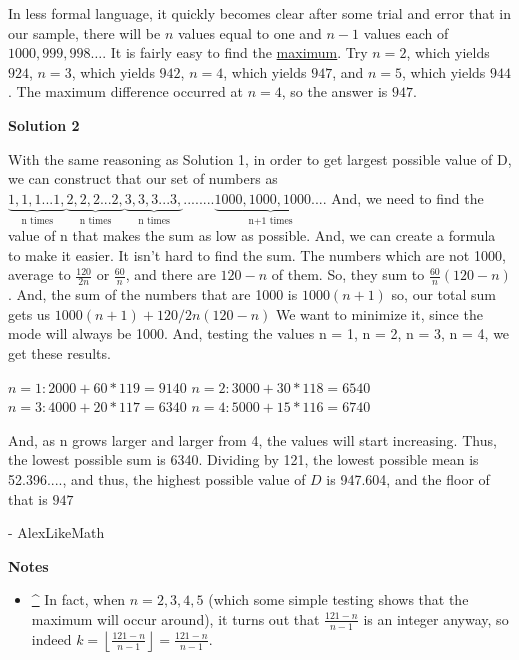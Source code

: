 \begin{enumerate}
 In less formal language, it quickly becomes clear after some trial and error that in our sample, there will be $n$ values equal to one and $n-1$ values each of $1000, 999, 998 \ldots$. It is fairly easy to find the \href{https://artofproblemsolving.com/wiki/index.php?title=Maximum}{maximum}. Try $n=2$, which yields $924$, $n=3$, which yields $942$,  $n=4$, which yields $947$, and $n=5$, which yields $944$. The maximum difference occurred at $n=4$, so the answer is $947$.

 



\textbf{Solution 2}

With the same reasoning as Solution 1, in order to get largest possible value of D, we can construct that our set of numbers as $\underbrace{1,1,1...1,}_\text{n times}\underbrace{2,2,2...2,}_\text{n times}\underbrace{3,3,3...3,}_\text{n times}........\underbrace{1000,1000,1000....}_\text{n+1  times}$ And, we need to find the value of n that makes the sum as low as possible. And, we can create a formula to make it easier. It isn't hard to find the sum. The numbers which are not 1000, average to $\frac{120}{2n}$ or $\frac{60}{n}$, and there are $120-n$ of them. So, they sum to $\frac{60}{n}(120-n)$. And, the sum of the numbers that are 1000 is $1000(n+1)$ so, our total sum gets us $1000(n+1)+120/2n(120-n)$ We want to minimize it, since the mode will always be 1000. And, testing the values n = 1, n = 2, n = 3, n = 4, we get these results.

 $n = 1: 2000+60*119 = 9140$
$n = 2: 3000+30*118 = 6540$
$n = 3: 4000+20*117 = 6340$
$n = 4: 5000+15*116 = 6740$

 And, as n grows larger and larger from 4, the values will start increasing. Thus, the lowest possible sum is 6340. Dividing by 121, the lowest possible mean is 52.396...., and thus, the highest possible value of $D$ is 947.604, and the floor of that is $\boxed{947}$

 - AlexLikeMath

 \textbf{Notes} 
            \begin{itemize}
        \item \href{https://artofproblemsolving.com\#ref\_1}{\textasciicircum{}} In fact, when $n = 2,3,4,5$ (which some simple testing shows that the maximum will occur around), it turns out that $\frac{121-n}{n-1}$ is an integer anyway, so indeed $k = \left\lfloor \frac{121-n}{n-1} \right\rfloor = \frac{121-n}{n-1}$.
            \end{itemize}
            



\end{enumerate}
